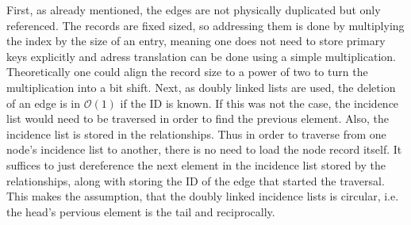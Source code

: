             First, as already mentioned, the edges are not physically duplicated but only referenced. 
            The records are fixed sized, so addressing them is done by multiplying the index by the size of an entry, meaning one does not need to store primary keys explicitly and adress translation can be done using a simple multiplication. 
            Theoretically one could align the record size to a power of two to turn the multiplication into a bit shift.
            Next, as doubly linked lists are used, the deletion of an edge is in $\mathcal{O}(1)$ if the ID is known.
            If this was not the case, the incidence list would need to be traversed in order to find the previous element.
            Also, the incidence list is stored in the relationships.
            Thus in order to traverse from one node's incidence list to another, there is no need to load the node record itself.
            It suffices to just dereference the next element in the incidence list stored by the relationships, along with storing the ID of the edge that started the traversal.
            This makes the assumption, that the doubly linked incidence lists is circular, i.e. the head's pervious element is the tail and reciprocally.

